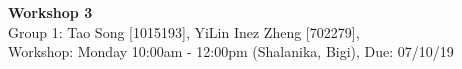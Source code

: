 \documentclass[11pt]{article}
\begin{document}

\begin{center}
\textbf{\Large{Workshop 3}}\\
Group 1: Tao Song [1015193], YiLin Inez Zheng [702279], \\
Workshop: Monday 10:00am - 12:00pm (Shalanika, Bigi), Due: 07/10/19  
\end{center}






\end{document}
